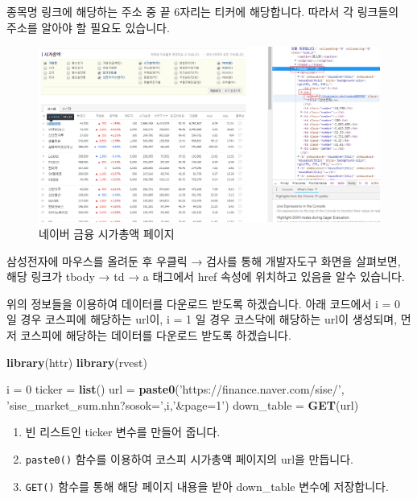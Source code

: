 \documentclass[12pt,]{book}
\newenvironment{Shaded}{\begin{snugshade}}{\end{snugshade}}
\newcommand{\DecValTok}[1]{\textcolor[rgb]{0.00,0.00,0.81}{#1}}
\newcommand{\KeywordTok}[1]{\textcolor[rgb]{0.13,0.29,0.53}{\textbf{#1}}}
\newcommand{\NormalTok}[1]{#1}
\newcommand{\StringTok}[1]{\textcolor[rgb]{0.31,0.60,0.02}{#1}}
\providecommand{\tightlist}{%
  \setlength{\itemsep}{0pt}\setlength{\parskip}{0pt}}
\begin{document}
종목명 링크에 해당하는 주소 중 끝 6자리는 티커에 해당합니다. 따라서 각 링크들의 주소를 알아야 할 필요도 있습니다.

\begin{figure}[h]

{\centering \includegraphics[width=1\linewidth]{images/crawl_naver_corp} 

}

\caption{네이버 금융 시가총액 페이지}\label{fig:unnamed-chunk-21}
\end{figure}

삼성전자에 마우스를 올려둔 후 우클릭 → 검사를 통해 개발자도구 화면을 살펴보면, 해당 링크가 tbody → td → a 태그에서 href 속성에 위치하고 있음을 알수 있습니다.

위의 정보들을 이용하여 데이터를 다운로드 받도록 하겠습니다. 아래 코드에서 i = 0 일 경우 코스피에 해당하는 url이, i = 1 일 경우 코스닥에 해당하는 url이 생성되며, 먼저 코스피에 해당하는 데이터를 다운로드 받도록 하겠습니다.

\begin{Shaded}
\begin{Highlighting}[]
\KeywordTok{library}\NormalTok{(httr)}
\KeywordTok{library}\NormalTok{(rvest)}

\NormalTok{i =}\StringTok{ }\DecValTok{0}
\NormalTok{ticker =}\StringTok{ }\KeywordTok{list}\NormalTok{()}
\NormalTok{url =}\StringTok{ }\KeywordTok{paste0}\NormalTok{(}\StringTok{'https://finance.naver.com/sise/'}\NormalTok{,}
             \StringTok{'sise_market_sum.nhn?sosok='}\NormalTok{,i,}\StringTok{'&page=1'}\NormalTok{)}
\NormalTok{down_table =}\StringTok{ }\KeywordTok{GET}\NormalTok{(url)}
\end{Highlighting}
\end{Shaded}

\begin{enumerate}
\def\labelenumi{\arabic{enumi}.}
\tightlist
\item
  빈 리스트인 ticker 변수를 만들어 줍니다.
\item
  \texttt{paste0()} 함수를 이용하여 코스피 시가총액 페이지의 url을 만듭니다.
\item
  \texttt{GET()} 함수를 통해 해당 페이지 내용을 받아 down\_table 변수에 저장합니다.
\end{enumerate}
\end{document}
